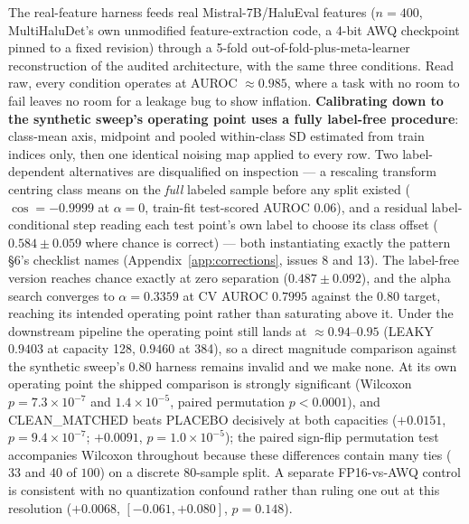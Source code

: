 \documentclass[10pt]{article} %
\begin{document}
The real-feature harness feeds real Mistral-7B/HaluEval features ($n=400$,
MultiHaluDet's own unmodified feature-extraction code, a 4-bit AWQ checkpoint
pinned to a fixed revision) through a 5-fold out-of-fold-plus-meta-learner
reconstruction of the audited architecture, with the same three conditions.
Read raw, every condition operates at AUROC $\approx0.985$, where a task with
no room to fail leaves no room for a leakage bug to show inflation.
\textbf{Calibrating down to the synthetic sweep's operating point uses a fully
label-free procedure}: class-mean axis, midpoint and pooled within-class SD
estimated from train indices only, then one identical noising map applied to
every row. Two label-dependent alternatives are disqualified on inspection ---
a rescaling transform centring class means on the \emph{full} labeled sample
before any split existed ($\cos=-0.9999$ at $\alpha=0$, train-fit test-scored
AUROC $0.06$), and a residual label-conditional step reading each test point's
own label to choose its class offset ($0.584\pm0.059$ where chance is
correct) --- both instantiating exactly the pattern §6's checklist names
(Appendix~\ref{app:corrections}, issues 8 and 13). The label-free version
reaches chance exactly at zero separation ($0.487\pm0.092$), and the alpha
search converges to $\alpha=0.3359$ at CV AUROC $0.7995$ against the $0.80$
target, reaching its intended operating point rather than saturating above
it. Under the downstream pipeline the operating point still lands at
$\approx0.94$--$0.95$ (LEAKY $0.9403$ at capacity 128, $0.9460$ at 384), so a
direct magnitude comparison against the synthetic sweep's $0.80$ harness
remains invalid and we make none. At its own operating point the shipped
comparison is strongly significant (Wilcoxon $p=7.3\times10^{-7}$ and
$1.4\times10^{-5}$, paired permutation $p<0.0001$), and CLEAN\_MATCHED beats
PLACEBO decisively at both capacities ($+0.0151$, $p=9.4\times10^{-7}$;
$+0.0091$, $p=1.0\times10^{-5}$); the paired sign-flip permutation test
accompanies Wilcoxon throughout because these differences contain many ties
($33$ and $40$ of $100$) on a discrete $80$-sample split. A separate
FP16-vs-AWQ control is consistent with no quantization confound rather than
ruling one out at this resolution ($+0.0068$, $[-0.061,+0.080]$, $p=0.148$).
\end{document}
